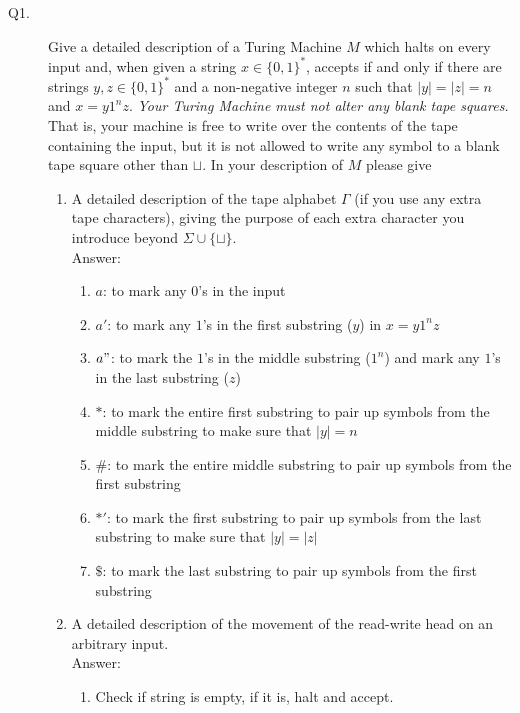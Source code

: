 \documentclass{csc_assignment}
\begin{document}
\begin{description}

\newpage
\item[Q1.]

Give a detailed description of a Turing Machine $M$ which halts on every input and, when given a string $x \in \{0,1\}^*$, accepts if and only if there are strings $y, z \in \{0,1\}^*$ and a non-negative integer $n$ such that $|y| = |z| = n$ and $x = y1^nz$.
  \emph{Your Turing Machine must not alter any blank tape squares.} That is, your machine is free to write over the contents of the tape containing the input, but it is not allowed to write any symbol to a blank tape square other than $\sqcup$. In your description of $M$ please give
  \begin{enumerate}
  \item A detailed description of the tape alphabet $\Gamma$ (if you use any extra tape characters), giving the purpose of each extra character you introduce beyond $\Sigma \cup \{\sqcup\}$.\\
  Answer: \begin{enumerate}
      \item $a$: to mark any $0$'s in the input
      \item $a'$: to mark any $1$'s in the first substring ($y$) in $x = y1^nz$
      \item $a"$: to mark the $1$'s in the middle substring ($1^n$) and mark any $1$'s in the last substring ($z$)
      \item $*$: to mark the entire first substring to pair up symbols from the middle substring to make sure that $|y| = n$
      \item $\#$: to mark the entire middle substring to pair up symbols from the first substring
      \item $*'$: to mark the first substring to pair up symbols from the last substring to make sure that $|y| = |z|$
      \item $\$$: to mark the last substring to pair up symbols from the first substring
  \end{enumerate}
  \item A detailed description of the movement of the read-write head on an arbitrary input.\\
  Answer: \begin{enumerate}
      \item Check if string is empty, if it is, halt and accept.

\end{enumerate}
\end{enumerate}
\end{description}
\end{document}
